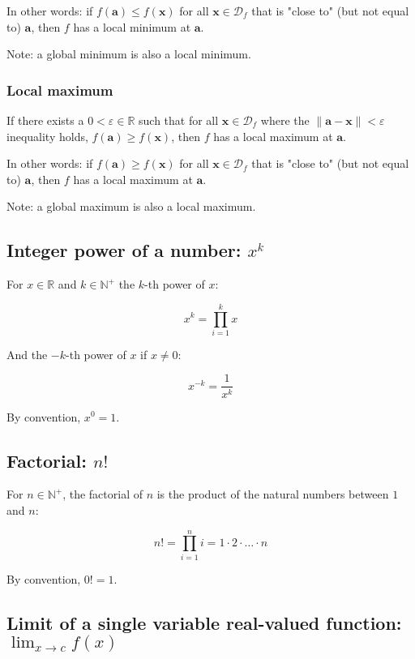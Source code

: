 \documentclass[titlepage]{article}
\begin{document}
          In other words: if $f(\mathbf{a}) \leq f(\mathbf{x})$ for all
          $\mathbf{x} \in \mathcal{D}_f$ that is "close to" (but not equal to)
          $\mathbf{a}$, then $f$ has a local minimum at $\mathbf{a}$.

          Note: a global minimum is also a local minimum.

        \subsubsection{Local maximum}

          If there exists a $0 < \varepsilon \in \mathbb{R}$ such that for all
          $\mathbf{x} \in \mathcal{D}_f$ where the
          $\| \mathbf{a} - \mathbf{x} \| < \varepsilon$ inequality holds,
          $f(\mathbf{a}) \geq f(\mathbf{x})$, then $f$ has a local maximum at
          $\mathbf{a}$.

          In other words: if $f(\mathbf{a}) \geq f(\mathbf{x})$ for all
          $\mathbf{x} \in \mathcal{D}_f$ that is "close to" (but not equal to)
          $\mathbf{a}$, then $f$ has a local maximum at $\mathbf{a}$.

          Note: a global maximum is also a local maximum.

      \subsection{Integer power of a number: $x^k$}

        For $x \in \mathbb{R}$ and $k \in \mathbb{N}^+$ the $k$-th power of $x$:

        $$x^k = \prod_{i=1}^k x$$

        And the $-k$-th power of $x$ if $x \neq 0$:

        $$x^{-k} = \frac{1}{x^k}$$

        By convention, $x^0 = 1$.

      \subsection{Factorial: $n!$}

        For $n \in \mathbb{N}^+$, the factorial of $n$ is the product of
        the natural numbers between $1$ and $n$:

        $$n! = \prod_{i=1}^n i = 1 \cdot 2 \cdot \ldots \cdot n$$

        By convention, $0! = 1$.

      \subsection{%
        Limit of a single variable real-valued function: $\lim_{x \to c} f(x)$
      }
\end{document}
